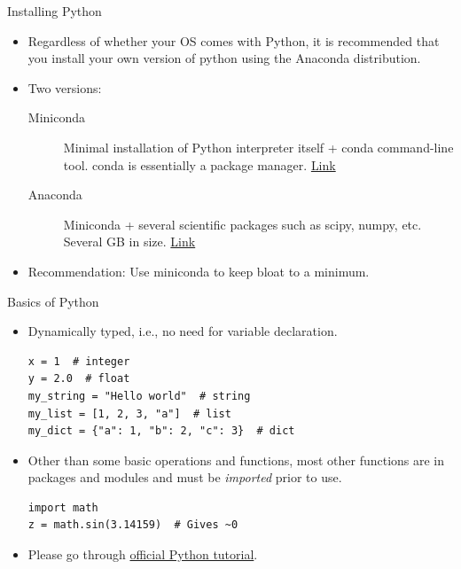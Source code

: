 \documentclass[aspectratio=169]{beamer}
\begin{document}
\begin{frame}{Installing Python}
    \begin{itemize}
        \item Regardless of whether your OS comes with Python, it is recommended that you install your own version of python using the Anaconda distribution.
        \item Two versions:
        \begin{description}
        \item[Miniconda] Minimal installation of Python interpreter itself + conda command-line tool. conda is essentially a package manager. \href{https://docs.conda.io/en/latest/miniconda.html}{Link}
        \item[Anaconda] Miniconda + several scientific packages such as scipy, numpy, etc. Several GB in size. \href{https://www.anaconda.com/distribution/}{Link}
        \end{description}
        \item Recommendation: Use miniconda to keep bloat to a minimum.
    \end{itemize}
\end{frame} 


\begin{frame}[fragile]{Basics of Python}
    \begin{itemize}
        \item Dynamically typed, i.e., no need for variable declaration.
        \begin{lstlisting}
x = 1  # integer
y = 2.0  # float
my_string = "Hello world"  # string
my_list = [1, 2, 3, "a"]  # list
my_dict = {"a": 1, "b": 2, "c": 3}  # dict
        \end{lstlisting}
        \item Other than some basic operations and functions, most other functions are in packages and modules and must be \textit{imported} prior to use.
        \begin{lstlisting}
import math
z = math.sin(3.14159)  # Gives ~0
        \end{lstlisting}
        \item Please go through \href{https://docs.python.org/3/tutorial/index.html}{official Python tutorial}.
    \end{itemize}
\end{frame} 
\end{document}
